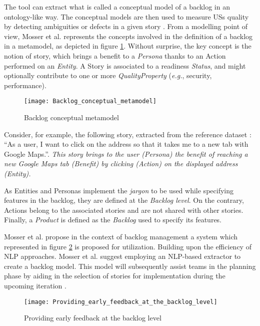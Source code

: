 The tool can extract what is called a conceptual model of a backlog in an ontology-like way. The conceptual models are then used to measure USs quality by detecting ambiguities or defects in a given story \cite{mosser2022modelling}.
From a modelling point of view, Mosser et al. represents the concepts involved in the deﬁnition of a backlog in a metamodel, as depicted in figure \ref{fig:conceptual_metamodel}. Without surprise, the key concept is the notion of story, which brings a benefit to a \emph{Persona} thanks to an Action performed on an \emph{Entity}. A Story is associated to a readiness \emph{Status}, and might optionally contribute to one or more \emph{QualityProperty} (\emph{e.g.}, security, performance).
\begin{figure}[h]
\center
\texttt{[image: Backlog\_conceptual\_metamodel]}
\caption{Backlog conceptual metamodel \cite{mosser2022modelling}}\label{fig:conceptual_metamodel}
\end{figure}

Consider, for example, the following story, extracted from the reference dataset \cite{Dalpiaz2018}: \enquote{As a user, I want to click on the address so that it takes me to a new tab with Google Maps.}. \emph{This story brings to the user (Persona) the benefit of reaching a new Google Maps tab (Benefit) by clicking (Action) on the displayed address (Entity).}

As Entities and Personas implement the \emph{jargon} to be used while specifying features in the backlog, they are deﬁned at the \emph{Backlog level}. On the contrary, Actions belong to the associated stories and are not shared with other stories. Finally, a \emph{Product} is deﬁned as the \emph{Backlog} used to specify its features.

Mosser et al. propose in the context of backlog management a system which represented in figure \ref{fig:early_feedback} is proposed for utilization. Building upon the efficiency of NLP approaches. Mosser et al. suggest employing an NLP-based extractor to create a backlog model. This model will subsequently assist teams in the planning phase by aiding in the selection of stories for implementation during the upcoming iteration \cite{mosser2022modelling}.
\begin{figure}[h]
\center
\texttt{[image: Providing\_early\_feedback\_at\_the\_backlog\_level]}
\caption{Providing early feedback at the backlog level \cite{mosser2022modelling}}\label{fig:early_feedback}
\end{figure}
